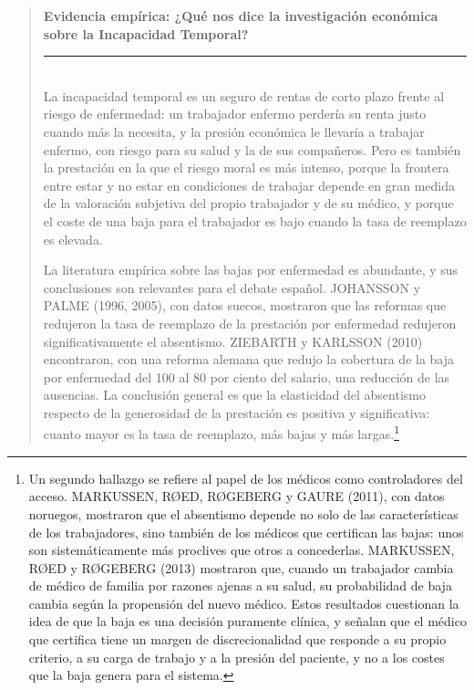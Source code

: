\documentclass[10pt,a4paper]{article}
\newenvironment{specialblock}[1]{%
      \begin{quote} %
      \small %
      \noindent\textbf{#1}\\[-0.3em] %
      \rule{\linewidth}{0.4pt}\\[0.6em]}{
      \end{quote}}
\begin{document}
\begin{specialblock}{\textbf{Evidencia empírica:} ¿Qué nos dice la investigación económica sobre la Incapacidad Temporal?}
    La incapacidad temporal es un seguro de rentas de corto plazo frente al riesgo de enfermedad: un trabajador enfermo perdería su renta justo cuando más la necesita, y la presión económica le llevaría a trabajar enfermo, con riesgo para su salud y la de sus compañeros. Pero es también la prestación en la que el riesgo moral es más intenso, porque la frontera entre estar y no estar en condiciones de trabajar depende en gran medida de la valoración subjetiva del propio trabajador y de su médico, y porque el coste de una baja para el trabajador es bajo cuando la tasa de reemplazo es elevada.
    
    La literatura empírica sobre las bajas por enfermedad es abundante, y sus conclusiones son relevantes para el debate español. JOHANSSON y PALME (1996, 2005), con datos suecos, mostraron que las reformas que redujeron la tasa de reemplazo de la prestación por enfermedad redujeron significativamente el absentismo. ZIEBARTH y KARLSSON (2010) encontraron, con una reforma alemana que redujo la cobertura de la baja por enfermedad del 100 al 80 por ciento del salario, una reducción de las ausencias. La conclusión general es que la elasticidad del absentismo respecto de la generosidad de la prestación es positiva y significativa: cuanto mayor es la tasa de reemplazo, más bajas y más largas.\footnote{Un segundo hallazgo se refiere al papel de los médicos como controladores del acceso. MARKUSSEN, RØED, RØGEBERG y GAURE (2011), con datos noruegos, mostraron que el absentismo depende no solo de las características de los trabajadores, sino también de los médicos que certifican las bajas: unos son sistemáticamente más proclives que otros a concederlas. MARKUSSEN, RØED y RØGEBERG (2013) mostraron que, cuando un trabajador cambia de médico de familia por razones ajenas a su salud, su probabilidad de baja cambia según la propensión del nuevo médico. Estos resultados cuestionan la idea de que la baja es una decisión puramente clínica, y señalan que el médico que certifica tiene un margen de discrecionalidad que responde a su propio criterio, a su carga de trabajo y a la presión del paciente, y no a los costes que la baja genera para el sistema.
}
\end{specialblock}
\end{document}
